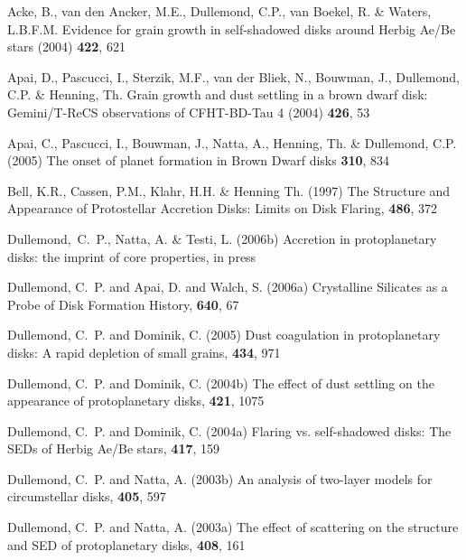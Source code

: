 %
%
%
%
\begin{ownpubl}
\item Acke, B., van den Ancker,  M.E., Dullemond, C.P., van Boekel, R. \&
  Waters, L.B.F.M. Evidence for grain growth in self-shadowed disks
  around Herbig Ae/Be stars (2004) \aap \textbf{422}, 621
\item Apai, D., Pascucci, I., Sterzik, M.F., van der Bliek, N., Bouwman, J.,
  Dullemond, C.P. \& Henning, Th. 
  Grain growth and dust settling in a brown dwarf disk: Gemini/T-ReCS
  observations of CFHT-BD-Tau 4 (2004) \aap \textbf{426}, 53
\item Apai, C.,  Pascucci, I., Bouwman, J., Natta, A., Henning, Th. \&
  Dullemond, C.P. (2005) The onset of planet formation in Brown Dwarf disks
  \sci \textbf{310}, 834
\item Bell, K.R., Cassen, P.M., Klahr, H.H. \& Henning Th. (1997)
  The Structure and Appearance of Protostellar Accretion Disks: Limits on
  Disk Flaring, \apj \textbf{486}, 372
\item Dullemond,~C.~P., Natta, A. \& Testi, L. (2006b) Accretion in
  protoplanetary disks: the imprint of core properties, \apj in press
\item {Dullemond}, C.~P. and {Apai}, D. and {Walch}, S. (2006a)
  Crystalline Silicates as a Probe of Disk Formation History, 
  \apjl \textbf{640}, 67
\item {Dullemond}, C.~P. and {Dominik}, C. (2005) Dust coagulation in
  protoplanetary disks: A rapid depletion of small grains, \aap
  \textbf{434}, 971
\item {Dullemond}, C.~P. and {Dominik}, C. (2004b) The effect of dust
  settling on the appearance of protoplanetary disks, \aap
  \textbf{421}, 1075 
\item {Dullemond}, C.~P. and {Dominik}, C. (2004a) Flaring
  vs. self-shadowed disks: The SEDs of Herbig Ae/Be stars, \aap
  \textbf{417}, 159
\item {Dullemond}, C.~P. and {Natta}, A. (2003b) An analysis of two-layer
  models for circumstellar disks, \aap \textbf{405}, 597
\item {Dullemond}, C.~P. and {Natta}, A. (2003a) The effect of scattering on
  the structure and SED of protoplanetary disks, \aap \textbf{408}, 161

\end{ownpubl}
